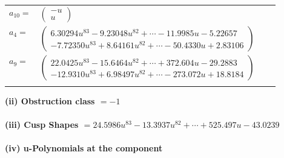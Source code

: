 \documentclass[1p]{elsarticle_modified}
\theoremstyle{definition}
\begin{document}
\begin{tabular}{m{7pt} m{180pt} m{7pt} m{180pt} }
\flushright $a_{10}=$&$\begin{pmatrix}- u\\u\end{pmatrix}$ \\
\flushright $a_{4}=$&$\begin{pmatrix}6.30294 u^{83}-9.23048 u^{82}+\cdots-11.9985 u-5.22657\\-7.72350 u^{83}+8.64161 u^{82}+\cdots-50.4330 u+2.83106\end{pmatrix}$ \\
\flushright $a_{9}=$&$\begin{pmatrix}22.0425 u^{83}-15.6464 u^{82}+\cdots+372.604 u-29.2883\\-12.9310 u^{83}+6.98497 u^{82}+\cdots-273.072 u+18.8184\end{pmatrix}$\\&\end{tabular}
\flushleft \textbf{(ii) Obstruction class $= -1$}\\~\\
\flushleft \textbf{(iii) Cusp Shapes $= 24.5986 u^{83}-13.3937 u^{82}+\cdots+525.497 u-43.0239$}\\~\\
\newpage\renewcommand{\arraystretch}{1}
\flushleft \textbf{(iv) u-Polynomials at the component}\newline \\
\end{document}
